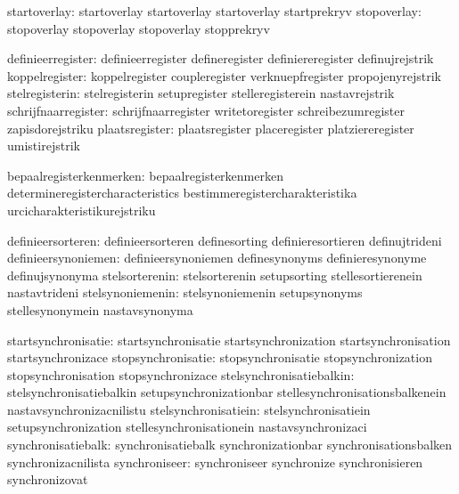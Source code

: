                  startoverlay:  startoverlay                 startoverlay
                                startoverlay                 startprekryv
                  stopoverlay:  stopoverlay                  stopoverlay
                                stopoverlay                  stopprekryv

            definieerregister:  definieerregister            defineregister
                                definiereregister            definujrejstrik
               koppelregister:  koppelregister               coupleregister
                                verknuepfregister            propojenyrejstrik
               stelregisterin:  stelregisterin               setupregister
                                stelleregisterein            nastavrejstrik
          schrijfnaarregister:  schrijfnaarregister          writetoregister
                                schreibezumregister          zapisdorejstriku
               plaatsregister:  plaatsregister               placeregister
                                platziereregister            umistirejstrik

      bepaalregisterkenmerken:  bepaalregisterkenmerken      determineregistercharacteristics
                                bestimmeregistercharakteristika urcicharakteristikurejstriku

            definieersorteren:  definieersorteren            definesorting
                                definieresortieren           definujtrideni
          definieersynoniemen:  definieersynoniemen          definesynonyms
                                definieresynonyme            definujsynonyma
               stelsorterenin:  stelsorterenin               setupsorting
                                stellesortierenein           nastavtrideni
             stelsynoniemenin:  stelsynoniemenin             setupsynonyms
                                stellesynonymein             nastavsynonyma

          startsynchronisatie:  startsynchronisatie          startsynchronization
                                startsynchronisation         startsynchronizace
           stopsynchronisatie:  stopsynchronisatie           stopsynchronization
                                stopsynchronisation          stopsynchronizace
     stelsynchronisatiebalkin:  stelsynchronisatiebalkin     setupsynchronizationbar
                                stellesynchronisationsbalkenein nastavsynchronizacnilistu
         stelsynchronisatiein:  stelsynchronisatiein         setupsynchronization
                                stellesynchronisationein     nastavsynchronizaci
           synchronisatiebalk:  synchronisatiebalk           synchronizationbar
                                synchronisationsbalken       synchronizacnilista
                synchroniseer:  synchroniseer                synchronize
                                synchronisieren              synchronizovat

